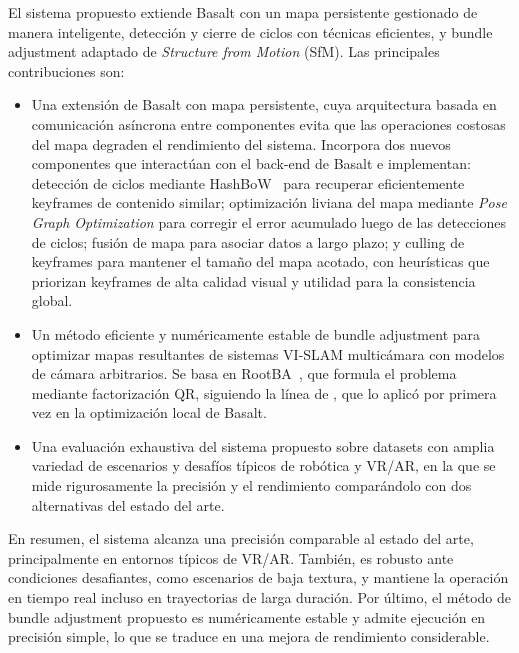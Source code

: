 El sistema propuesto extiende Basalt con un mapa persistente gestionado de manera inteligente, detección y cierre de ciclos con técnicas eficientes, y bundle adjustment adaptado de \textit{Structure from Motion} (SfM). Las principales contribuciones son:
\begin{itemize}
    \item Una extensión de Basalt con mapa persistente, cuya arquitectura basada en comunicación asíncrona entre componentes evita que las operaciones costosas del mapa degraden el rendimiento del sistema. Incorpora dos nuevos componentes que interactúan con el back-end de Basalt e implementan: detección de ciclos mediante HashBoW~\cite{hashbow2024stricker} para recuperar eficientemente keyframes de contenido similar; optimización liviana del mapa mediante \textit{Pose Graph Optimization} para corregir el error acumulado luego de las detecciones de ciclos; fusión de mapa para asociar datos a largo plazo; y culling de keyframes para mantener el tamaño del mapa acotado, con heurísticas que priorizan keyframes de alta calidad visual y utilidad para la consistencia global.
    \item Un método eficiente y numéricamente estable de bundle adjustment para optimizar mapas resultantes de sistemas VI-SLAM multicámara con modelos de cámara arbitrarios. Se basa en RootBA~\cite{demmelBasaltSquareRoot2021a}, que formula el problema mediante factorización QR, siguiendo la línea de \cite{demmelBasaltSquareRoot2021}, que lo aplicó por primera vez en la optimización local de Basalt.
    \item Una evaluación exhaustiva del sistema propuesto sobre datasets con amplia variedad de escenarios y desafíos típicos de robótica y VR/AR, en la que se mide rigurosamente la precisión y el rendimiento comparándolo con dos alternativas del estado del arte.
\end{itemize}

En resumen, el sistema alcanza una precisión comparable al estado del arte, principalmente en entornos típicos de VR/AR. También, es robusto ante condiciones desafiantes, como escenarios de baja textura, y mantiene la operación en tiempo real incluso en trayectorias de larga duración. Por último, el método de bundle adjustment propuesto es numéricamente estable y admite ejecución en precisión simple, lo que se traduce en una mejora de rendimiento considerable.
